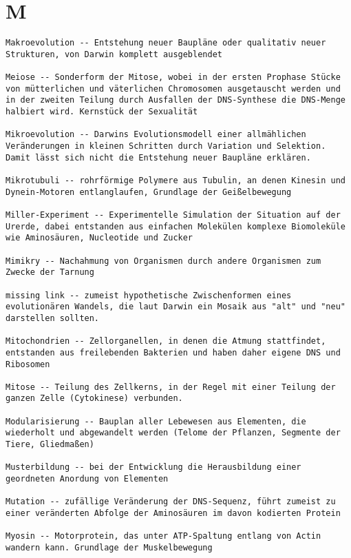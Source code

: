 \documentclass{article}
\begin{document}
\section{M}
\begin{verbatim}
Makroevolution -- Entstehung neuer Baupläne oder qualitativ neuer Strukturen, von Darwin komplett ausgeblendet

Meiose -- Sonderform der Mitose, wobei in der ersten Prophase Stücke von mütterlichen und väterlichen Chromosomen ausgetauscht werden und in der zweiten Teilung durch Ausfallen der DNS-Synthese die DNS-Menge halbiert wird. Kernstück der Sexualität

Mikroevolution -- Darwins Evolutionsmodell einer allmählichen Veränderungen in kleinen Schritten durch Variation und Selektion. Damit lässt sich nicht die Entstehung neuer Baupläne erklären.

Mikrotubuli -- rohrförmige Polymere aus Tubulin, an denen Kinesin und Dynein-Motoren entlanglaufen, Grundlage der Geißelbewegung

Miller-Experiment -- Experimentelle Simulation der Situation auf der Urerde, dabei entstanden aus einfachen Molekülen komplexe Biomoleküle wie Aminosäuren, Nucleotide und Zucker

Mimikry -- Nachahmung von Organismen durch andere Organismen zum Zwecke der Tarnung

missing link -- zumeist hypothetische Zwischenformen eines evolutionären Wandels, die laut Darwin ein Mosaik aus "alt" und "neu" darstellen sollten. 

Mitochondrien -- Zellorganellen, in denen die Atmung stattfindet, entstanden aus freilebenden Bakterien und haben daher eigene DNS und Ribosomen

Mitose -- Teilung des Zellkerns, in der Regel mit einer Teilung der ganzen Zelle (Cytokinese) verbunden.

Modularisierung -- Bauplan aller Lebewesen aus Elementen, die wiederholt und abgewandelt werden (Telome der Pflanzen, Segmente der Tiere, Gliedmaßen)

Musterbildung -- bei der Entwicklung die Herausbildung einer geordneten Anordung von Elementen

Mutation -- zufällige Veränderung der DNS-Sequenz, führt zumeist zu einer veränderten Abfolge der Aminosäuren im davon kodierten Protein

Myosin -- Motorprotein, das unter ATP-Spaltung entlang von Actin wandern kann. Grundlage der Muskelbewegung
\end{verbatim}
\newpage
\end{document}
